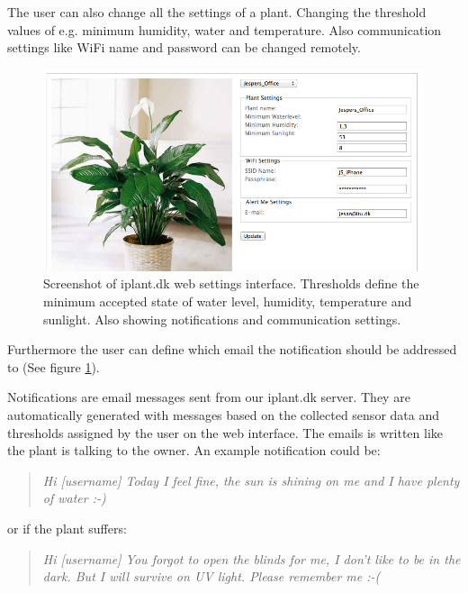 \documentclass{ubicomp2012}
\begin{document}
The user can also change all the settings of a plant. Changing the threshold values of e.g. minimum humidity, water and temperature. Also communication settings like WiFi name and password can be changed remotely.

\begin{figure}[h!]
\centering
\includegraphics[width=\columnwidth]{web_settings.png}
\caption{Screenshot of iplant.dk web settings interface. Thresholds define the minimum accepted state of water level, humidity, temperature and sunlight. Also showing notifications and communication settings.}
\label{fig:web_settings}
\end{figure}

Furthermore the user can define which email the notification should be addressed to (See figure \ref{fig:web_settings}).

Notifications are email messages sent from our iplant.dk server. They are automatically generated with messages based on the collected sensor data and thresholds assigned by the user on the web interface. The emails is written like the plant is talking to the owner.
An example notification could be: 
\begin{quotation}
\emph{Hi [username]
Today I feel fine, the sun is shining on me and I have plenty of water :-) }
\end{quotation}
or if the plant suffers:
\begin{quotation}
\emph{Hi [username]
You forgot to open the blinds for me, I don't like to be in the dark. But I will survive on UV light. Please remember me :-( }
\end{quotation}
\end{document}

